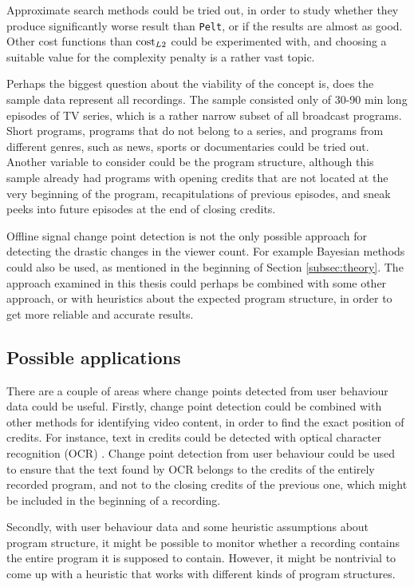 Approximate search methods could be tried out, in order to study whether they produce significantly worse result than \texttt{Pelt}, or if the results are almost as good. Other cost functions than $\operatorname{cost}_{L2}$ could be experimented with, and 
choosing a suitable value for the complexity penalty is a rather vast topic.

Perhaps the biggest question about the viability of the concept is, does the sample data represent all recordings. The sample consisted only of 30-90 min long episodes of TV series, which is a rather narrow subset of all broadcast programs. Short programs, programs that do not belong to a series, and programs from different genres, such as news, sports or documentaries could be tried out. Another variable to consider could be the program structure, although this sample already had programs with opening credits that are not located at the very beginning of the program, recapitulations of previous episodes, and sneak peeks into future episodes at the end of closing credits.

Offline signal change point detection is not the only possible approach for detecting the drastic changes in the viewer count. For example Bayesian methods could also be used, as mentioned in the beginning of Section \ref{subsec:theory}.
The approach examined in this thesis could perhaps be combined with some other approach, or with heuristics about the expected program structure, in order to get more reliable and accurate results.

\subsection{Possible applications}

There are a couple of areas where change points detected from user behaviour data could be useful. Firstly, change point detection could be combined with other methods for identifying video content, in order to find the exact position of credits. For instance, text in credits could be detected with optical character recognition (OCR) \cite{ngoVideoTextDetection2005}. Change point detection from user behaviour could be used to ensure that the text found by OCR belongs to the credits of the entirely recorded program, and not to the closing credits of the previous one, which might be included in the beginning of a recording.

Secondly, with user behaviour data and some heuristic assumptions about program structure, it might be possible to monitor whether a recording contains the entire program it is supposed to contain. However, it might be nontrivial to come up with a heuristic that works with different kinds of program structures.

